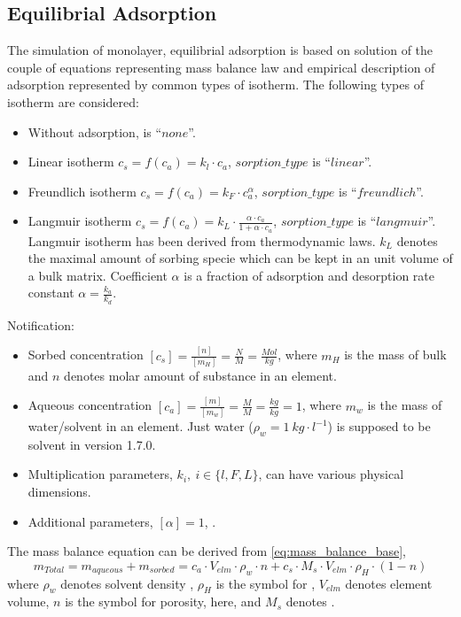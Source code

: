 \subsection{Equilibrial Adsorption}
\label{sec:sorp_math}

The simulation of monolayer, equilibrial adsorption is based on solution of the couple of equations representing mass balance law and empirical description of adsorption represented by common types of isotherm. The following types of isotherm are considered:
\begin{itemize}
 \item Without adsorption,  is ``$none$''.
 \item Linear isotherm $c_s = f(c_a) = k_l\cdot c_a$, $sorption\_type$ is ``$linear$''.
 \item Freundlich isotherm $c_s = f(c_a) = k_F\cdot c_a^{\alpha}$, $sorption\_type$ is ``$freundlich$''.
 \item Langmuir isotherm $c_s = f(c_a) = k_L\cdot \frac{\alpha\cdot c_a}{1 + \alpha\cdot c_a}$, $sorption\_type$ is ``$langmuir$''. Langmuir isotherm has been derived from thermodynamic laws. $k_L$ denotes the maximal amount of sorbing specie which can be kept in an unit volume of a bulk matrix. Coefficient $\alpha$ is a fraction of adsorption and desorption rate constant $\alpha = \frac{k_a}{k_d}$.
\end{itemize}
Notification:
\begin{itemize}
 \item Sorbed concentration $[c_s] = \frac{[n]}{[m_H]} = \frac{N}{M} = \frac{Mol}{kg}$, where $m_H$ is the mass of bulk and $n$ denotes molar amount of substance in an element.
 \item Aqueous concentration $[c_a] = \frac{[m]}{[m_w]} = \frac{M}{M} = \frac{kg}{kg} = 1$, where $m_w$ is the mass of water/solvent in an element. Just water ($\rho_w = 1~kg\cdot l^{-1}$) is supposed to be solvent in version 1.7.0. 
 \item Multiplication parameters, $k_i, ~i\in\{ l,F,L\}$,  can have various physical dimensions.
 \item Additional parameters, $[\alpha] = 1$, .
\end{itemize}
The mass balance equation can be derived from \ref{eq:mass_balance_base},
\begin{equation}
  m_{Total} = m_{aqueous} + m_{sorbed} = c_a\cdot V_{elm}\cdot\rho_w\cdot n + c_s\cdot M_s \cdot V_{elm}\cdot\rho_H\cdot(1-n)
  \label{eq:mass_balance_base}
\end{equation}
where $\rho_w$ denotes solvent density , $\rho_H$ is the symbol for , $V_{elm}$ denotes element volume, $n$ is the symbol for porosity, here, and $M_s$ denotes .

